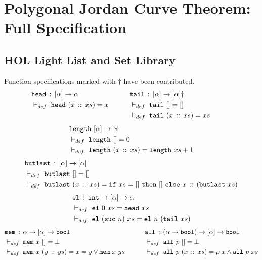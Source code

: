 \chapter{Polygonal Jordan Curve Theorem: Full Specification}
\label{app:JordanVerification}
\section{HOL Light List and Set Library}
Function specifications marked with $\dag$ have been contributed.
\begin{align*}
  & \texttt{head}\,:\,[\alpha] \rightarrow \alpha &\qquad
  & \texttt{tail}\,:\,[\alpha] \rightarrow [\alpha]\dag\\
  & \vdash_{def}\;\texttt{head}\ (x\,::\,xs) = x &\qquad
  & \vdash_{def}\;\texttt{tail}\ [] = []\\
  &&&\vdash_{def}\;\texttt{tail}\ (x\,::\,xs) = xs &\qquad
\end{align*}
\begin{align*}
  & \texttt{length}\ [\alpha]\rightarrow \mathbb{N}\\
  & \vdash_{def}\;\texttt{length}\ [] = 0\\
  & \vdash_{def}\;\texttt{length}\ (x\,::\,xs) = \texttt{length}\ xs + 1
\end{align*}
\begin{align*}
  &\code{butlast}\,:\,[\alpha] \rightarrow [\alpha]\\
  &\vdash_{def}\;\code{butlast}\ [] = []\\
  &\vdash_{def}\;\code{butlast}\ (\cons{x}{xs}) = \code{if}\ xs=[]\ \code{then}\ []\ \code{else}\ \cons{x}{(\code{butlast}\ xs)}
\end{align*}
\begin{align*}
  &\code{el}\,:\,\code{int} \rightarrow [\alpha] \rightarrow \alpha\\
  &\vdash_{def}\;\code{el}\ 0\ xs = \code{head}\ xs\\
  &\vdash_{def}\;\code{el}\ (\code{suc}\ n)\ xs = \code{el}\ n\ (\code{tail}\ xs)
\end{align*}
\begin{align*}
  & \texttt{mem}\,:\,\alpha \rightarrow [\alpha] \rightarrow \texttt{bool} &\qquad
  & \texttt{all}\,:\,(\alpha\rightarrow\texttt{bool}) \rightarrow [\alpha] \rightarrow \texttt{bool}\\
  & \vdash_{def}\;\texttt{mem}\ x\ [] = \bot &\qquad
  & \vdash_{def}\;\texttt{all}\ p\ [] = \bot\\
  & \vdash_{def}\;\texttt{mem}\ x\ (y\,::\,ys) = x = y \vee \texttt{mem}\ x\ ys &\qquad
  & \vdash_{def}\;\texttt{all}\ p\ (x\,::\,xs) = p\ x \wedge \texttt{all}\ p\ xs   
\end{align*}
